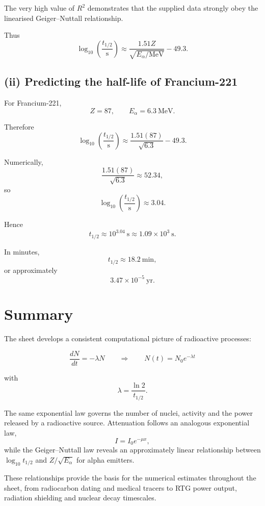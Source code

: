 \documentclass[11pt,a4paper]{article}
\begin{document}
The very high value of $R^2$ demonstrates that the supplied data strongly obey
the linearised Geiger--Nuttall relationship.

Thus
\[
\boxed{
\log_{10}\left(\frac{t_{1/2}}{\mathrm s}\right)
\approx
\frac{1.51Z}{\sqrt{E_\alpha/\mathrm{MeV}}}
-49.3
}.
\]

\subsection{(ii) Predicting the half-life of Francium-221}

For Francium-221,
\[
Z=87,
\qquad
E_\alpha=6.3\ \mathrm{MeV}.
\]

Therefore
\[
\log_{10}\left(\frac{t_{1/2}}{\mathrm s}\right)
\approx
\frac{1.51(87)}{\sqrt{6.3}}-49.3.
\]

Numerically,
\[
\frac{1.51(87)}{\sqrt{6.3}}
\approx52.34,
\]
so
\[
\log_{10}\left(\frac{t_{1/2}}{\mathrm s}\right)
\approx3.04.
\]

Hence
\[
t_{1/2}
\approx10^{3.04}\ \mathrm s
\approx
\boxed{1.09\times10^3\ \mathrm s}.
\]

In minutes,
\[
\boxed{t_{1/2}\approx18.2\ \mathrm{min}},
\]
or approximately
\[
\boxed{3.47\times10^{-5}\ \mathrm{yr}}.
\]

\section*{Summary}

The sheet develops a consistent computational picture of radioactive processes:

\[
\boxed{
\frac{dN}{dt}=-\lambda N
}
\qquad\Longrightarrow\qquad
\boxed{
N(t)=N_0e^{-\lambda t}
}
\]

with
\[
\boxed{
\lambda=\frac{\ln2}{t_{1/2}}
}.
\]

The same exponential law governs the number of nuclei, activity and the power
released by a radioactive source. Attenuation follows an analogous exponential
law,
\[
I=I_0e^{-\mu x},
\]
while the Geiger--Nuttall law reveals an approximately linear relationship between
$\log_{10}t_{1/2}$ and $Z/\sqrt{E_\alpha}$ for alpha emitters.

These relationships provide the basis for the numerical estimates throughout the
sheet, from radiocarbon dating and medical tracers to RTG power output, radiation
shielding and nuclear decay timescales.
\end{document}
